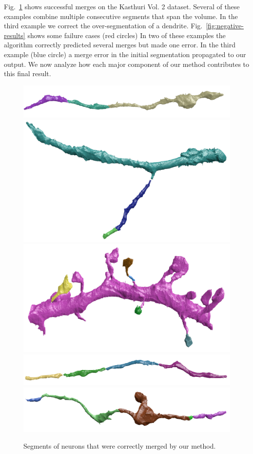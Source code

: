 Fig.~\ref{fig:positive-results} shows successful merges on the Kasthuri Vol. 2 dataset. Several of these examples combine multiple consecutive segments that span the volume.
In the third example we correct the over-segmentation of a dendrite.
Fig.~\ref{fig:negative-results} shows some failure cases (red circles)
In two of these examples the algorithm correctly predicted several merges but made one error.
In the third example (blue circle) a merge error in the initial segmentation propagated to our output.
We now analyze how each major component of our method contributes to this final result.

\begin{figure}[t]
	\centering
	\includegraphics[width=0.85\linewidth]{./figures/VI-results/multicut-correct1.png}
	\includegraphics[width=0.85\linewidth]{./figures/VI-results/multicut-correct2.png}
	\includegraphics[width=0.85\linewidth]{./figures/VI-results/multicut-correct3.png}
	\includegraphics[width=0.85\linewidth]{./figures/VI-results/multicut-correct4.png}
	\includegraphics[width=0.85\linewidth]{./figures/VI-results/multicut-correct5.png}
	\caption{Segments of neurons that were correctly merged by our method.}
	\label{fig:positive-results}
\end{figure}

